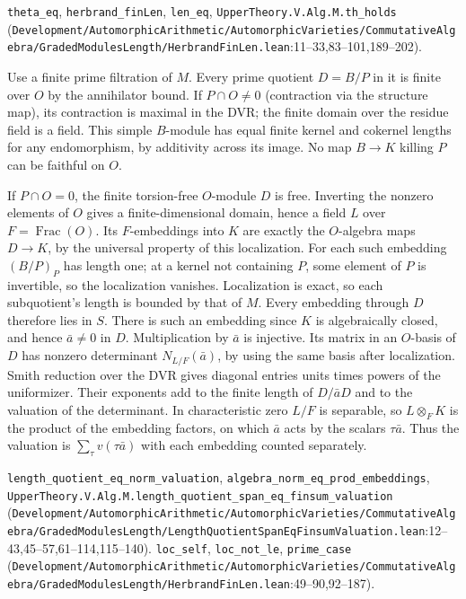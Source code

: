 {\footnotesize \nolinkurl{theta_eq}, \nolinkurl{herbrand_finLen}, \nolinkurl{len_eq}, \nolinkurl{UpperTheory.V.Alg.M.th_holds} (\nolinkurl{Development/AutomorphicArithmetic/AutomorphicVarieties/CommutativeAlgebra/GradedModulesLength/HerbrandFinLen.lean}\allowbreak:11--33,83--101,189--202).}

Use a finite prime filtration of $M$. Every prime quotient $D=B/P$ in it is finite over $O$ by the annihilator bound. If $P\cap O\ne0$ (contraction via the structure map), its contraction is maximal in the DVR; the finite domain over the residue field is a field. This simple $B$-module has equal finite kernel and cokernel lengths for any endomorphism, by additivity across its image. No map $B\to K$ killing $P$ can be faithful on $O$.

If $P\cap O=0$, the finite torsion-free $O$-module $D$ is free. Inverting the nonzero elements of $O$ gives a finite-dimensional domain, hence a field $L$ over $F=\operatorname{Frac}(O)$. Its $F$-embeddings into $K$ are exactly the $O$-algebra maps $D\to K$, by the universal property of this localization. For each such embedding $(B/P)_P$ has length one; at a kernel not containing $P$, some element of $P$ is invertible, so the localization vanishes. Localization is exact, so each subquotient's length is bounded by that of $M$. Every embedding through $D$ therefore lies in $S$. There is such an embedding since $K$ is algebraically closed, and hence $\bar a\ne0$ in $D$. Multiplication by $\bar a$ is injective. Its matrix in an $O$-basis of $D$ has nonzero determinant $N_{L/F}(\bar a)$, by using the same basis after localization. Smith reduction over the DVR gives diagonal entries units times powers of the uniformizer. Their exponents add to the finite length of $D/\bar aD$ and to the valuation of the determinant. In characteristic zero $L/F$ is separable, so $L\otimes_F K$ is the product of the embedding factors, on which $\bar a$ acts by the scalars $\tau\bar a$. Thus the valuation is $\sum_\tau v(\tau\bar a)$ with each embedding counted separately.

{\footnotesize \nolinkurl{length_quotient_eq_norm_valuation}, \nolinkurl{algebra_norm_eq_prod_embeddings}, \nolinkurl{UpperTheory.V.Alg.M.length_quotient_span_eq_finsum_valuation} (\nolinkurl{Development/AutomorphicArithmetic/AutomorphicVarieties/CommutativeAlgebra/GradedModulesLength/LengthQuotientSpanEqFinsumValuation.lean}\allowbreak:12--43,45--57,61--114,115--140). \nolinkurl{loc_self}, \nolinkurl{loc_not_le}, \nolinkurl{prime_case} (\nolinkurl{Development/AutomorphicArithmetic/AutomorphicVarieties/CommutativeAlgebra/GradedModulesLength/HerbrandFinLen.lean}\allowbreak:49--90,92--187).}


